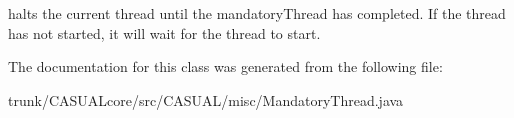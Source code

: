 halts the current thread until the mandatory\-Thread has completed. If the thread has not started, it will wait for the thread to start. 

The documentation for this class was generated from the following file\-:\begin{DoxyCompactItemize}
\item 
trunk/\-C\-A\-S\-U\-A\-Lcore/src/\-C\-A\-S\-U\-A\-L/misc/Mandatory\-Thread.\-java\end{DoxyCompactItemize}
